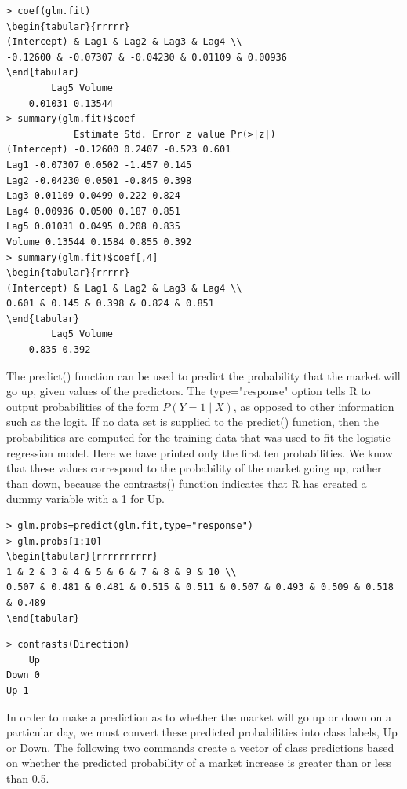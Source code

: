 \documentclass[10pt]{article}
\begin{document}
\begin{verbatim}
> coef(glm.fit)
\begin{tabular}{rrrrr} 
(Intercept) & Lag1 & Lag2 & Lag3 & Lag4 \\
-0.12600 & -0.07307 & -0.04230 & 0.01109 & 0.00936
\end{tabular}
        Lag5 Volume
    0.01031 0.13544
> summary(glm.fit)$coef
            Estimate Std. Error z value Pr(>|z|)
(Intercept) -0.12600 0.2407 -0.523 0.601
Lag1 -0.07307 0.0502 -1.457 0.145
Lag2 -0.04230 0.0501 -0.845 0.398
Lag3 0.01109 0.0499 0.222 0.824
Lag4 0.00936 0.0500 0.187 0.851
Lag5 0.01031 0.0495 0.208 0.835
Volume 0.13544 0.1584 0.855 0.392
> summary(glm.fit)$coef[,4]
\begin{tabular}{rrrrr} 
(Intercept) & Lag1 & Lag2 & Lag3 & Lag4 \\
0.601 & 0.145 & 0.398 & 0.824 & 0.851
\end{tabular}
        Lag5 Volume
    0.835 0.392
\end{verbatim}

The predict() function can be used to predict the probability that the market will go up, given values of the predictors. The type="response" option tells R to output probabilities of the form $P(Y=1 \mid X)$, as opposed to other information such as the logit. If no data set is supplied to the predict() function, then the probabilities are computed for the training data that was used to fit the logistic regression model. Here we have printed only the first ten probabilities. We know that these values correspond to the probability of the market going up, rather than down, because the contrasts() function indicates that R has created a dummy variable with a 1 for Up.

\begin{verbatim}
> glm.probs=predict(glm.fit,type="response")
> glm.probs[1:10]
\begin{tabular}{rrrrrrrrrr}
1 & 2 & 3 & 4 & 5 & 6 & 7 & 8 & 9 & 10 \\
0.507 & 0.481 & 0.481 & 0.515 & 0.511 & 0.507 & 0.493 & 0.509 & 0.518 & 0.489
\end{tabular}
\end{verbatim}

\begin{verbatim}
> contrasts(Direction)
    Up
Down 0
Up 1
\end{verbatim}

In order to make a prediction as to whether the market will go up or down on a particular day, we must convert these predicted probabilities into class labels, Up or Down. The following two commands create a vector of class predictions based on whether the predicted probability of a market increase is greater than or less than 0.5.
\end{document}
